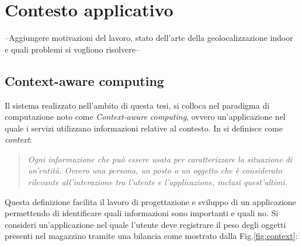 \chapter{Contesto applicativo }
--Aggiungere motivazioni del lavoro, stato  dell’arte della geolocalizzazione indoor e quali problemi si vogliono risolvere-- \\

\section{Context-aware computing}
\label{context-aware}
Il sistema realizzato nell'ambito di questa tesi, si colloca nel paradigma di computazione noto come \textit{Context-aware computing}, ovvero un'applicazione nel quale i servizi utilizzano informazioni relative al contesto. In \cite{context} si definisce come \textit{context}:

\begin{quotation}
\textit{Ogni informazione che può essere usata per caratterizzare la situazione di un'entità. Ovvero una persona, un posto o un oggetto che è considerato rilevante all'interazione tra l'utente e l'applicazione, inclusi quest'ultimi.}
\end{quotation}

Questa definizione facilita il lavoro di progettazione e sviluppo di un applicazione permettendo di identificare quali informazioni sono importanti e quali no.
Si consideri un'applicazione nel quale l'utente deve registrare il peso degli oggetti presenti nel magazzino tramite una bilancia come mostrato dalla Fig.\ref{fig:context}:

